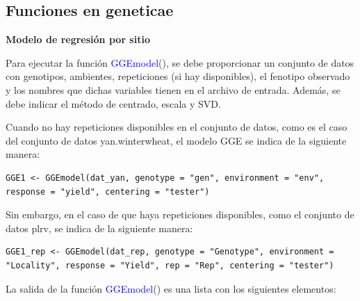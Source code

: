  
 
\subsection{Funciones en geneticae}

\textbf{Modelo de regresión por sitio}

Para ejecutar la función \textcolor{blue}{GGEmodel}(), se debe proporcionar un conjunto de datos con genotipos, ambientes, repeticiones (si hay disponibles), el fenotipo observado y los nombres que dichas variables tienen en el archivo de entrada. Además, se debe indicar el método de centrado, escala y SVD.

Cuando no hay repeticiones disponibles en el conjunto de datos, como es el caso del conjunto de datos yan.winterwheat, el modelo GGE se indica de la siguiente manera:
\begin{tcolorbox}[colframe=aurometalsaurus,colback=backcolour,colbacklower=white,
    width=1\linewidth,
    height=0.1\linewidth,
    boxsep=-3mm]
\begin{lstlisting}
GGE1 <- GGEmodel(dat_yan, genotype = "gen", environment = "env", response = "yield", centering = "tester")
\end{lstlisting}
\end{tcolorbox}
Sin embargo, en el caso de que haya repeticiones disponibles, como el conjunto de datos plrv, se indica de la siguiente manera:

\begin{tcolorbox}[colframe=aurometalsaurus,colback=backcolour,colbacklower=white,
    width=1\linewidth,
    height=0.1\linewidth,
    boxsep=-3mm]
\begin{lstlisting}
GGE1_rep <- GGEmodel(dat_rep, genotype = "Genotype", environment = "Locality", response = "Yield", rep = "Rep", centering = "tester")
\end{lstlisting}
\end{tcolorbox}

La salida de la función \textcolor{blue}{GGEmodel}() es una lista con los siguientes elementos:

